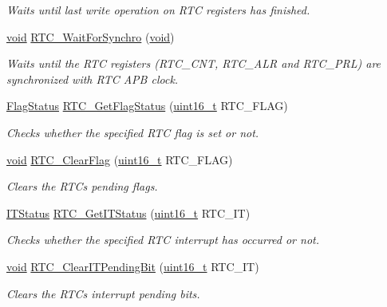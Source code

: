 \begin{DoxyCompactItemize}
\begin{DoxyCompactList}\small\item\em Waits until last write operation on R\+TC registers has finished. \end{DoxyCompactList}\item 
\hyperlink{usb__devapi_8h_afabf60e7f57651d6d595a02c75f07cd0}{void} \hyperlink{group___r_t_c___private___functions_gaca4346e0dc15dccc15179786b28450db}{R\+T\+C\+\_\+\+Wait\+For\+Synchro} (\hyperlink{usb__devapi_8h_afabf60e7f57651d6d595a02c75f07cd0}{void})
\begin{DoxyCompactList}\small\item\em Waits until the R\+TC registers (R\+T\+C\+\_\+\+C\+NT, R\+T\+C\+\_\+\+A\+LR and R\+T\+C\+\_\+\+P\+RL) are synchronized with R\+TC A\+PB clock. \end{DoxyCompactList}\item 
\hyperlink{agilefox_2library_2inc_2stm32f10x__type_8h_a89136caac2e14c55151f527ac02daaff}{Flag\+Status} \hyperlink{group___r_t_c___private___functions_ga21a85e5f846cb4552d5e76420779f3f6}{R\+T\+C\+\_\+\+Get\+Flag\+Status} (\hyperlink{_p_e___types_8h_a1f1825b69244eb3ad2c7165ddc99c956}{uint16\+\_\+t} R\+T\+C\+\_\+\+F\+L\+AG)
\begin{DoxyCompactList}\small\item\em Checks whether the specified R\+TC flag is set or not. \end{DoxyCompactList}\item 
\hyperlink{usb__devapi_8h_afabf60e7f57651d6d595a02c75f07cd0}{void} \hyperlink{group___r_t_c___private___functions_gacefb05730a77ffaa273c1ac3ade1a22f}{R\+T\+C\+\_\+\+Clear\+Flag} (\hyperlink{_p_e___types_8h_a1f1825b69244eb3ad2c7165ddc99c956}{uint16\+\_\+t} R\+T\+C\+\_\+\+F\+L\+AG)
\begin{DoxyCompactList}\small\item\em Clears the R\+TC\textquotesingle{}s pending flags. \end{DoxyCompactList}\item 
\hyperlink{agilefox_2library_2inc_2stm32f10x__type_8h_aacbd7ed539db0aacd973a0f6eca34074}{I\+T\+Status} \hyperlink{group___r_t_c___private___functions_ga23274ad8aa28e86d5b0d58eee295db21}{R\+T\+C\+\_\+\+Get\+I\+T\+Status} (\hyperlink{_p_e___types_8h_a1f1825b69244eb3ad2c7165ddc99c956}{uint16\+\_\+t} R\+T\+C\+\_\+\+IT)
\begin{DoxyCompactList}\small\item\em Checks whether the specified R\+TC interrupt has occurred or not. \end{DoxyCompactList}\item 
\hyperlink{usb__devapi_8h_afabf60e7f57651d6d595a02c75f07cd0}{void} \hyperlink{group___r_t_c___private___functions_ga62b9a04d89a11f28db7dcfd50d9ee768}{R\+T\+C\+\_\+\+Clear\+I\+T\+Pending\+Bit} (\hyperlink{_p_e___types_8h_a1f1825b69244eb3ad2c7165ddc99c956}{uint16\+\_\+t} R\+T\+C\+\_\+\+IT)
\begin{DoxyCompactList}\small\item\em Clears the R\+TC\textquotesingle{}s interrupt pending bits. \end{DoxyCompactList}\end{DoxyCompactItemize}


